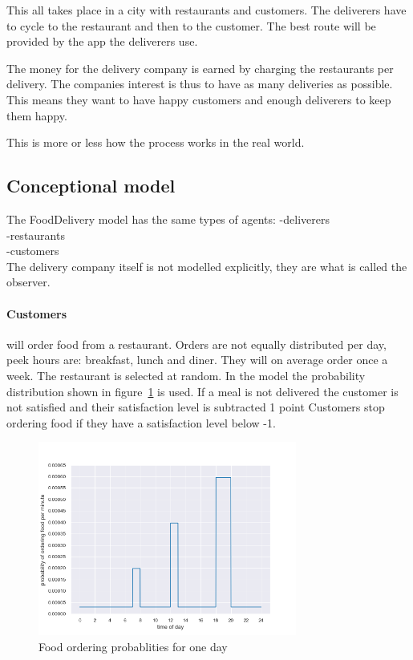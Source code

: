 This all takes place in a city with restaurants and customers.
The deliverers have to cycle to the restaurant and then to the customer.
The best route will be provided by the app the deliverers use.

The money for the delivery company is earned by charging the restaurants per delivery.
The companies interest is thus to have as many deliveries as possible.
This means they want to have happy customers and enough deliverers to keep them happy.

This is more or less how the process works in the real world.

\subsection{Conceptional model}\label{subsec:conceptional-model}
The FoodDelivery model has the same types of agents:
-deliverers \\
-restaurants \\
-customers \\

The delivery company itself is not modelled explicitly, they are what is called the observer.

\paragraph{Customers} will order food from a restaurant.
Orders are not equally distributed per day, peek hours are: breakfast, lunch and diner.
They will on average order once a week.
The restaurant is selected at random.
In the model the probability distribution shown in figure~\ref{fig:food_ordering_distribution} is used.
If a meal is not delivered the customer is not satisfied and their satisfaction level is subtracted 1 point
Customers stop ordering food if they have a satisfaction level below -1.

\begin{figure}
    \centering
    \includegraphics[width=8.5cm]{sections/pics/food_ordering_distribution}
    \caption{Food ordering probablities for one day}
    \label{fig:food_ordering_distribution}
\end{figure}

